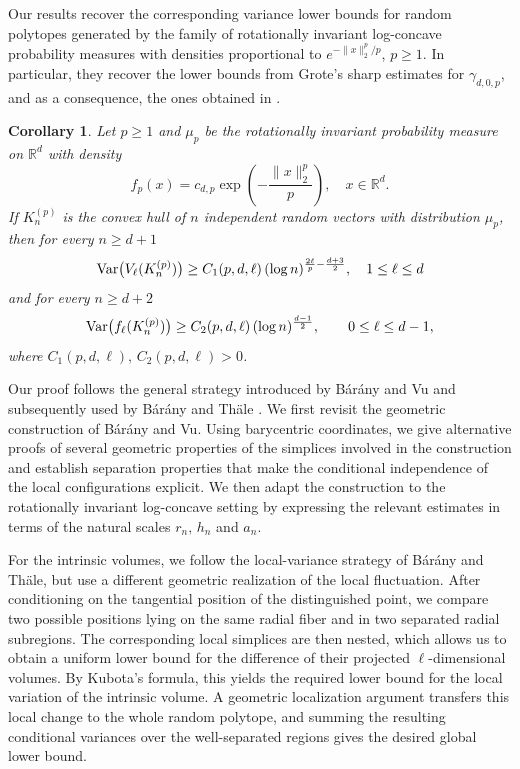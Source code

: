 \documentclass[10pt]{amsart}
\newcommand{\1}{\textbf{1}}
\newcommand{\Var}{{\rm Var}}
\numberwithin{equation}{section} %
\newtheorem{corollary}[theorem]{Corollary}
\theoremstyle{remark}
\theoremstyle{definition}
\begin{document}
Our results recover the corresponding variance lower bounds for random polytopes generated by the family of rotationally invariant log-concave probability measures with densities proportional to \(e^{-\|x\|_2^p/p}\), \(p\geq 1\). In particular, they recover the lower bounds from Grote's \cite{GroteGamma} sharp estimates for $\gamma_{d,0,p}$, and as a consequence, the ones obtained in \cite{Bar-Th,Bar-Vu}.  
\begin{corollary}\label{cor:classical-distributions}
Let $p\geq1$ and $\mu_p$ be the rotationally invariant probability measure on $\mathbb{R}^d$ with density
$$
f_p(x)=c_{d,p}\exp\left(-\frac{\|x\|_2^p}{p}\right), \quad x\in \mathbb{R}^d.
$$
If $K_n^{(p)}$ is the convex hull of $n$ independent random vectors with distribution $\mu_p$, then for every $ n \geq d+1$
$$
\Var\bigl(V_\ell(K_n^{(p)})\bigr)
\geq C_1(p,d,\ell)\,
(\log n)^{\frac{2\ell}{p}-\frac{d+3}{2}},
\quad 1\leq\ell\leq d
$$
and for every $n \geq d+2$
$$
\Var\bigl(f_\ell(K_n^{(p)})\bigr)
\geq C_2(p,d,\ell)\,
(\log n)^{\frac{d-1}{2}},
\qquad 0\leq \ell\leq d-1,
$$
where $C_1(p,d,\ell),\,C_2(p,d,\ell)>0$.
\end{corollary}

Our proof follows the general strategy introduced by B\'ar\'any and Vu
\cite{Bar-Vu} and subsequently used by B\'ar\'any and Th\"ale
\cite{Bar-Th}. We first revisit the geometric construction of B\'ar\'any
and Vu. Using barycentric coordinates, we give alternative proofs of several
geometric properties of the simplices involved in the construction and
establish separation properties that make the conditional
independence of the local configurations explicit. We then adapt the construction to the rotationally
invariant log-concave setting by expressing the relevant estimates in terms
of the natural scales $r_n, \,h_n$ and $a_n$.

For the intrinsic volumes, we follow the local-variance strategy of
B\'ar\'any and Th\"ale, but use a different geometric realization of the
local fluctuation. After conditioning on the tangential position of the
distinguished point, we compare two possible positions lying on the same
radial fiber and in two separated radial subregions. The corresponding local
simplices are then nested, which allows us to obtain a uniform lower bound
for the difference of their projected $\ell$-dimensional volumes. By
Kubota's formula, this yields the required lower bound for the local
variation of the intrinsic volume. A geometric localization argument
transfers this local change to the whole random polytope, and summing the
resulting conditional variances over the well-separated regions gives the
desired global lower bound.
\end{document}
